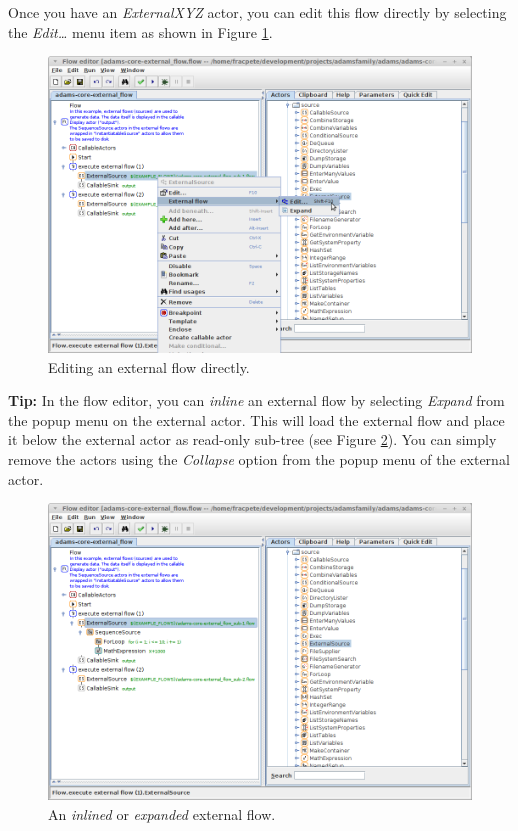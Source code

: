 Once you have an \textit{ExternalXYZ} actor, you can edit this flow directly by 
selecting the \textit{Edit\ldots} menu item as shown in Figure 
\ref{floweditor-externalactors1_editsubflow}.
\begin{figure}[htb]
  \centering
  \includegraphics[width=12.0cm]{images/floweditor-externalactors1_editsubflow.png}
  \caption{Editing an external flow directly.}
  \label{floweditor-externalactors1_editsubflow}
\end{figure}

\textbf{Tip:} In the flow editor, you can \textit{inline} an external flow by
selecting \textit{Expand} from the popup menu on the external
actor. This will load the external flow and place it below the external actor
as read-only sub-tree (see Figure \ref{floweditor-externalactors1_expandedsubflow}). You can simply remove the actors using the
\textit{Collapse} option from the popup menu of the external actor.

\begin{figure}[htb]
  \centering
  \includegraphics[width=12.0cm]{images/floweditor-externalactors1_expandedsubflow.png}
  \caption{An \textit{inlined} or \textit{expanded} external flow.}
  \label{floweditor-externalactors1_expandedsubflow}
\end{figure}

